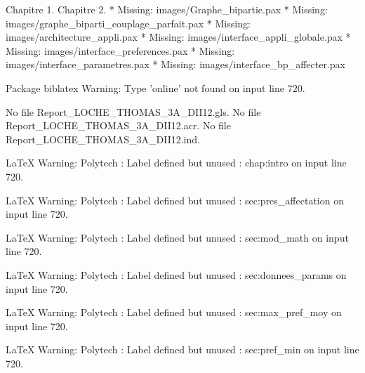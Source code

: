 Chapitre 1.
Chapitre 2.
* Missing: images/Graphe_bipartie.pax
* Missing: images/graphe_biparti_couplage_parfait.pax
* Missing: images/architecture_appli.pax
* Missing: images/interface_appli_globale.pax
* Missing: images/interface_preferences.pax
* Missing: images/interface_parametres.pax
* Missing: images/interface_bp_affecter.pax

Package biblatex Warning: Type 'online' not found on input line 720.

No file Report_LOCHE_THOMAS_3A_DII12.gls.
No file Report_LOCHE_THOMAS_3A_DII12.acr.
No file Report_LOCHE_THOMAS_3A_DII12.ind.

LaTeX Warning: Polytech : Label defined but unused : chap:intro on input line 720.


LaTeX Warning: Polytech : Label defined but unused : sec:pres_affectation on input line 720.


LaTeX Warning: Polytech : Label defined but unused : sec:mod_math on input line 720.


LaTeX Warning: Polytech : Label defined but unused : sec:donnees_params on input line 720.


LaTeX Warning: Polytech : Label defined but unused : sec:max_pref_moy on input line 720.


LaTeX Warning: Polytech : Label defined but unused : sec:pref_min on input line 720.





